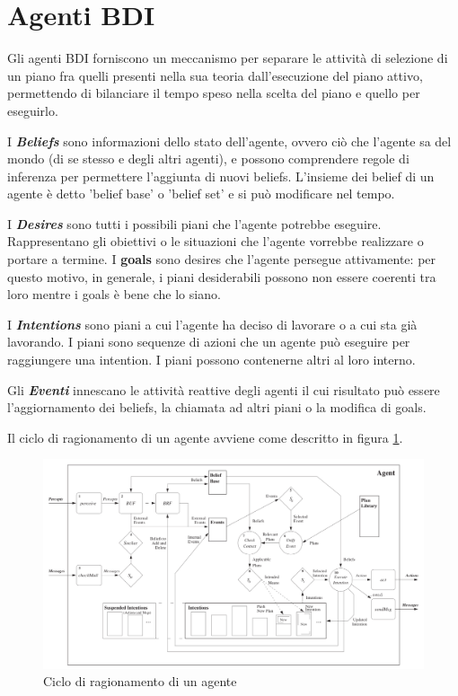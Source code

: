 \documentclass[12pt,a4paper,openright,twoside]{report}
\begin{document}
\section{Agenti BDI}
Gli agenti BDI forniscono un meccanismo per separare le attivit\`a di selezione di un piano fra quelli presenti nella sua teoria dall'esecuzione del piano attivo, permettendo di bilanciare il tempo speso nella scelta del piano e quello per eseguirlo.

I \textbf{\textit{Beliefs}} sono informazioni dello stato dell'agente, ovvero ci\`o che l'agente sa del mondo (di se stesso e degli altri agenti), e possono comprendere regole di inferenza per permettere l'aggiunta di nuovi beliefs. L'insieme dei belief di un agente \`e detto 'belief base' o 'belief set' e si pu\`o modificare nel tempo.

I \textbf{\textit{Desires}} sono tutti i possibili piani che l'agente potrebbe eseguire. Rappresentano gli obiettivi o le situazioni che l'agente vorrebbe realizzare o portare a termine. I \textbf{goals} sono desires che l'agente persegue attivamente: per questo motivo, in generale, i piani desiderabili possono non essere coerenti tra loro mentre i goals \`e bene che lo siano.

I \textbf{\textit{Intentions}} sono piani a cui l'agente ha deciso di lavorare o a cui sta gi\`a lavorando. I piani sono sequenze di azioni che un agente pu\`o eseguire per raggiungere una intention. I piani possono contenerne altri al loro interno.

Gli \textbf{\textit{Eventi}} innescano le attivit\`a reattive degli agenti il cui risultato pu\`o essere l'aggiornamento dei beliefs, la chiamata ad altri piani o la modifica di goals.

Il ciclo di ragionamento di un agente avviene come descritto in figura \ref{fig:reasoningCicle}.
\begin{figure}[h] %
\begin{center} %
\includegraphics[width=16cm]{images/reasoningCicle.png} %
\caption[Ciclo di ragionamento di un agente]{Ciclo di ragionamento di un agente} \label{fig:reasoningCicle}
\end{center}
\end{figure}
\end{document}
